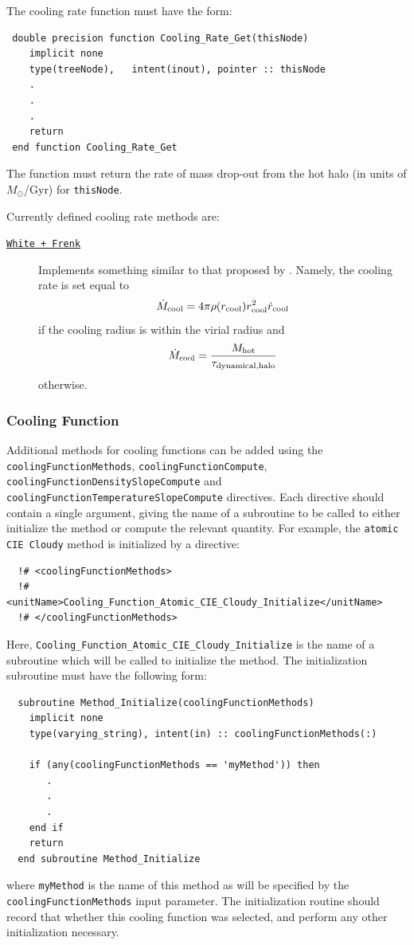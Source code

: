 The cooling rate function must have the form:
\begin{verbatim}
 double precision function Cooling_Rate_Get(thisNode)
    implicit none
    type(treeNode),   intent(inout), pointer :: thisNode
    .
    .
    .
    return
 end function Cooling_Rate_Get
\end{verbatim}
The function must return the rate of mass drop-out from the hot halo (in units of $M_\odot$/Gyr) for {\tt thisNode}. 

Currently defined cooling rate methods are:
\begin{description}
 \item [\hyperlink{cooling.cooling_rate.White-Frenk.F90:cooling_rates_white_frenk:cooling_rate_white_frenk}{{\tt White + Frenk}}] Implements something similar to that proposed by \cite{white_galaxy_1991}. Namely, the cooling rate is set equal to
 \begin{equation}
  \dot{M}_{\rm cool} = 4 \pi \rho(r_{\rm cool}) r_{\rm cool}^2 \dot{r}_{\rm cool}
 \end{equation}
 if the cooling radius is within the virial radius and
 \begin{equation}
  \dot{M}_{\rm cool} = {M_{\rm hot} \over \tau_{\rm dynamical,halo}}
 \end{equation}
 otherwise.
\end{description}

\subsubsection{Cooling Function}\label{sec:CoolingFunctionMethods}

Additional methods for cooling functions can be added using the {\tt coolingFunctionMethods}, {\tt coolingFunctionCompute}, {\tt coolingFunctionDensitySlopeCompute} and {\tt coolingFunctionTemperatureSlopeCompute} directives. Each directive should contain a single argument, giving the name of a subroutine to be called to either initialize the method or compute the relevant quantity. For example, the {\tt atomic CIE Cloudy} method is initialized by a directive:
\begin{verbatim}
  !# <coolingFunctionMethods>
  !#  <unitName>Cooling_Function_Atomic_CIE_Cloudy_Initialize</unitName>
  !# </coolingFunctionMethods>
\end{verbatim}
Here, {\tt Cooling\_Function\_Atomic\_CIE\_Cloudy\_Initialize} is the name of a subroutine which will be called to initialize the method. The initialization subroutine must have the following form:
\begin{verbatim}
  subroutine Method_Initialize(coolingFunctionMethods)
    implicit none
    type(varying_string), intent(in) :: coolingFunctionMethods(:)
    
    if (any(coolingFunctionMethods == 'myMethod')) then
       .
       .
       .
    end if
    return
  end subroutine Method_Initialize
\end{verbatim}
where {\tt myMethod} is the name of this method as will be specified by the {\tt coolingFunctionMethods} input parameter. The initialization routine should record that whether this cooling function was selected, and perform any other initialization necessary.

